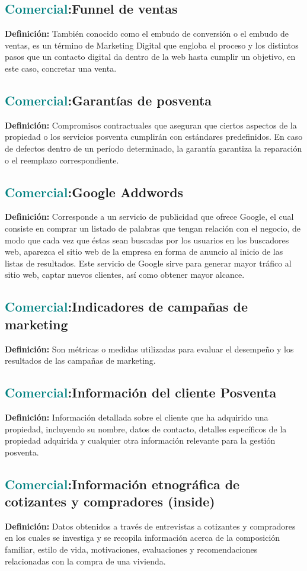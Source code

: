 \documentclass[12pt]{article}
\begin{document}
\subsection{\textcolor{teal}{Comercial}:{Funnel de ventas}}
\textbf{Definición:} También conocido como el embudo de conversión o el embudo de ventas, es un término de Marketing Digital que engloba el proceso y los distintos pasos que un contacto digital da dentro de la web hasta cumplir un objetivo, en este caso, concretar una venta.
\subsection{\textcolor{teal}{Comercial}:{Garantías de posventa}}
\textbf{Definición:} Compromisos contractuales que aseguran que ciertos aspectos de la propiedad o los servicios posventa cumplirán con estándares predefinidos. En caso de defectos dentro de un período determinado, la garantía garantiza la reparación o el reemplazo correspondiente.
\subsection{\textcolor{teal}{Comercial}:{Google Addwords}}
\textbf{Definición:} Corresponde a un servicio de publicidad que ofrece Google, el cual consiste en comprar un listado de palabras que tengan relación con el negocio, de modo que cada vez que éstas sean buscadas por los usuarios en los buscadores web, aparezca el sitio web de la empresa en forma de anuncio al inicio de las listas de resultados. Este servicio de Google sirve para generar mayor tráfico al sitio web, captar nuevos clientes, así como obtener mayor alcance.
\subsection{\textcolor{teal}{Comercial}:{Indicadores de campañas de marketing}}
\textbf{Definición:} Son métricas o medidas utilizadas para evaluar el desempeño y los resultados de las campañas de marketing.
\subsection{\textcolor{teal}{Comercial}:{Información del cliente Posventa}}
\textbf{Definición:} Información detallada sobre el cliente que ha adquirido una propiedad, incluyendo su nombre, datos de contacto, detalles específicos de la propiedad adquirida y cualquier otra información relevante para la gestión posventa.
\subsection{\textcolor{teal}{Comercial}:{Información etnográfica de cotizantes y compradores (inside)}}
\textbf{Definición:} Datos obtenidos a través de entrevistas a cotizantes y compradores en los cuales se investiga y se recopila información acerca de la composición familiar, estilo de vida, motivaciones, evaluaciones y recomendaciones relacionadas con la compra de una vivienda.
\end{document}
